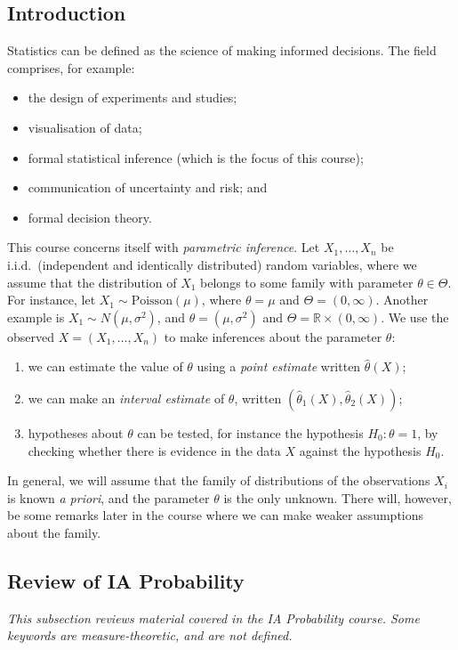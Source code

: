 \subsection{Introduction}
Statistics can be defined as the science of making informed decisions.
The field comprises, for example:
\begin{itemize}
	\item the design of experiments and studies;
	\item visualisation of data;
	\item formal statistical inference (which is the focus of this course);
	\item communication of uncertainty and risk; and
	\item formal decision theory.
\end{itemize}
This course concerns itself with \textit{parametric inference}.
Let \( X_1, \dots, X_n \) be i.i.d.\ (independent and identically distributed) random variables, where we assume that the distribution of \( X_1 \) belongs to some family with parameter \( \theta \in \Theta \).
For instance, let \( X_1 \sim \mathrm{Poisson}(\mu) \), where \( \theta = \mu \) and \( \Theta = (0, \infty) \).
Another example is \( X_1 \sim N(\mu, \sigma^2) \), and \( \theta = (\mu, \sigma^2) \) and \( \Theta = \mathbb R \times (0, \infty) \).
We use the observed \( X = (X_1, \dots, X_n) \) to make inferences about the parameter \( \theta \):
\begin{enumerate}
	\item we can estimate the value of \( \theta \) using a \textit{point estimate} written \( \hat \theta(X) \);
	\item we can make an \textit{interval estimate} of \( \theta \), written \( (\hat \theta_1(X), \hat \theta_2(X)) \);
	\item hypotheses about \( \theta \) can be tested, for instance the hypothesis \( H_0 \colon \theta = 1 \), by checking whether there is evidence in the data \( X \) against the hypothesis \( H_0 \).
\end{enumerate}
\begin{remark}
	In general, we will assume that the family of distributions of the observations \( X_i \) is known \textit{a priori}, and the parameter \( \theta \) is the only unknown.
	There will, however, be some remarks later in the course where we can make weaker assumptions about the family.
\end{remark}

\subsection{Review of IA Probability}
\textit{This subsection reviews material covered in the IA Probability course. Some keywords are measure-theoretic, and are not defined.}

